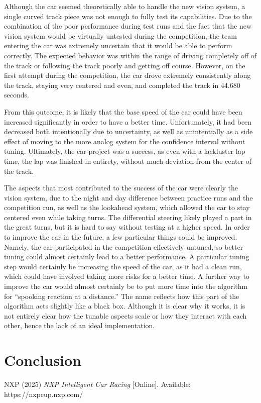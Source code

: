 \documentclass[conference]{IEEEtran}
\begin{document}
    Although the car seemed theoretically able to handle the new vision system, a single curved track piece was not enough to fully test its capabilities.
    Due to the combination of the poor performance during test runs and the fact that the new vision system would be virtually untested during the competition, the team entering the car
    was extremely uncertain that it would be able to perform correctly.
    The expected behavior was within the range of driving completely off of the track or following the track poorly and getting off course.
    However, on the first attempt during the competition, the car drove extremely consistently along the track, staying very centered and even, and completed the track in 44.680 seconds.

    From this outcome, it is likely that the base speed of the car could have been increased significantly in order to have a better time. Unfortunately, it had been decreased both intentionally
    due to uncertainty, as well as unintentially as a side effect of moving to the more analog system for the confidence interval without tuning. Ultimately, the car project was a success, as even
    with a lackluster lap time, the lap was finished in entirety, without much deviation from the center of the track.

    The aspects that most contributed to the success of the car were clearly the vision system, due to the night and day difference between practice runs and the competition run, as well as the lookahead system,
    which allowed the car to stay centered even while taking turns. The differential steering likely played a part in the great turns, but it is hard to say without testing at a higher speed. In order to improve
    the car in the future, a few particular things could be improved. Namely, the car participated in the competition effectively untuned, so better tuning could almost certainly lead to a better performance.
    A particular tuning step would certainly be increasing the speed of the car, as it had a clean run, which could have involved taking more risks for a better time.
    A further way to improve the car would almost certainly be to put more time into the algorithm for ``spooking reaction at a distance.''
    The name reflects how this part of the algorithm acts slightly like a black box. 
    Although it is clear why it works, it is not entirely clear how the tunable aspects scale or how they interact with each other, hence the lack of an ideal implementation.

\section{Conclusion}


\begin{thebibliography}{00}
    NXP (2025) \emph{NXP Intelligent Car Racing} [Online]. Available: https://nxpcup.nxp.com/
    \end{thebibliography}
\end{document}

